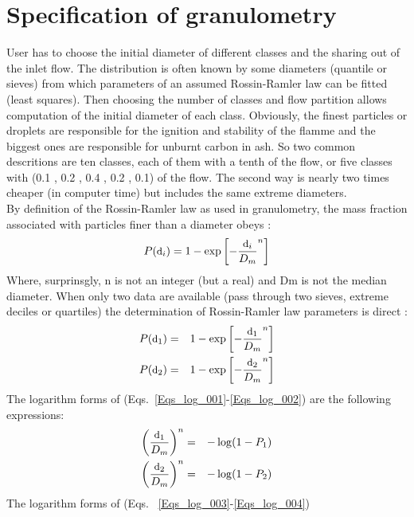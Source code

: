 \section*{Specification of granulometry}

User has to choose the initial diameter of different classes and the sharing out
of the inlet flow. The distribution is often known by some diameters (quantile
or sieves) from which parameters of an assumed Rossin-Ramler law can be fitted
(least squares). Then choosing the number of classes and flow partition allows
computation of the initial diameter of each class. Obviously, the finest
particles or droplets are responsible for the ignition and stability of the
flamme and the biggest ones are responsible for unburnt carbon in ash. So two
common descritions are ten classes, each of them with a tenth of the flow, or
five classes with (0.1 , 0.2 , 0.4 , 0.2 , 0.1) of the flow. The second way is
nearly two times cheaper (in computer time) but includes the same extreme
diameters. \\
By definition of the Rossin-Ramler law as used in granulometry, the mass
fraction associated with particles finer than a diameter obeys :
\begin{equation}
  \displaystyle P(\mbox{\small d}_i) = 1-\exp{\left[-\displaystyle\frac{\mbox{\small d}_i}{D_m} ^n \right]}
\end{equation} 
Where, surprinsgly, n is not an integer (but a real) and Dm is not the median
diameter. When only two data are available (pass through two sieves, extreme
deciles or quartiles) the determination of Rossin-Ramler law parameters is
direct :
\begin{eqnarray}
  \displaystyle P(\mbox{\small d}_1) &=& 1-\exp\left[-\frac{\mbox{\small d}_1}{D_m}^n\right] \label{Eqs_log_001} \\
  \displaystyle P(\mbox{\small d}_2) &=& 1-\exp\left[-\frac{\mbox{\small d}_2}{D_m}^n\right] \label{Eqs_log_002}
\end{eqnarray}
The logarithm forms of (Eqs.~\ref{Eqs_log_001}-\ref{Eqs_log_002}) are the
following expressions:
\begin{eqnarray}
  \displaystyle \left(\frac{\mbox{\small d}_1}{D_m} \right)^n &=& - \log(1-P_1) \label{Eqs_log_003} \\
  \displaystyle \left(\frac{\mbox{\small d}_2}{D_m} \right)^n &=& - \log(1-P_2) \label{Eqs_log_004} 
\end{eqnarray}
The logarithm forms of (Eqs. ~\ref{Eqs_log_003}-\ref{Eqs_log_004})
